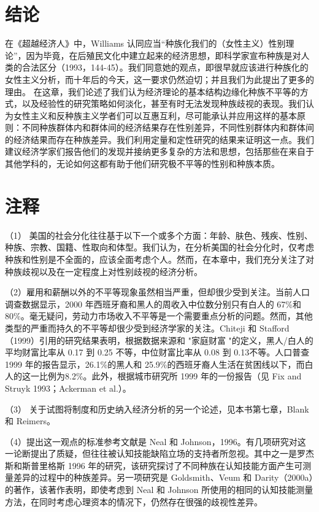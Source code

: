 \documentclass[UTF8]{ctexart}
\begin{document}
\section{结论}在《超越经济人》中，Williams 认同应当“种族化我们的（女性主义）性别理论”，因为毕竟，在后殖民文化中建立起来的经济思想，即科学家宣布种族是对人类的合法区分（1993，144-45）。我们同意她的观点，即很早就应该进行种族化的女性主义分析，而十年后的今天，这一要求仍然迫切；并且我们为此提出了更多的理由。
在这章，我们论述了我们认为经济理论的基本结构边缘化种族不平等的方式，以及经验性的研究策略如何淡化，甚至有时无法发现种族歧视的表现。我们认为女性主义和反种族主义学者们可以互惠互利，尽可能承认并应用这样的基本原则：不同种族群体内和群体间的经济结果存在性别差异，不同性别群体内和群体间的经济结果而存在种族差异。我们利用定量和定性研究的结果来证明这一点。我们建议经济学家们报告他们的发现并接纳更多复杂的方法和思想，包括那些在来自于其他学科的，无论如何这都有助于他们研究极不平等的性别和种族本质。

\section{注释}
（1）  美国的社会分化往往基于以下一个或多个方面：年龄、肤色、残疾、性别、种族、宗教、国籍、性取向和体型。我们认为，在分析美国的社会分化时，仅考虑种族和性别是不全面的，应该全面考虑个人。然而，在本章中，我们充分关注了对种族歧视以及在一定程度上对性别歧视的经济分析。


（2）雇用和薪酬以外的不平等现象虽然相当严重，但却很少受到关注。当前人口调查数据显示，2000 年西班牙裔和黑人的周收入中位数分别只有白人的 67\%和 80\%。毫无疑问，劳动力市场收入不平等是一个需要重点分析的问题。然而，其他类型的严重而持久的不平等却很少受到经济学家的关注。Chiteji 和 Stafford（1999）引用的研究结果表明，根据数据来源和 "家庭财富 "的定义，黑人/白人的平均财富比率从 0.17 到 0.25 不等，中位财富比率从 0.08 到 0.13不等。人口普查 1999 年的报告显示，26.1\%的黑人和 25.9\%的西班牙裔人生活在贫困线以下，而白人的这一比例为8.2\%。此外，根据城市研究所 1999 年的一份报告（见 Fix and Struyk 1993；Ackerman et al.）。


（3）  关于试图将制度和历史纳入经济分析的另一个论述，见本书第七章，Blank 和 Reimers。


（4）提出这一观点的标准参考文献是 Neal 和 Johnson，1996。有几项研究对这一论断提出了质疑，但往往被认知技能缺陷立场的支持者所忽视。其中之一是罗杰斯和斯普里格斯 1996 年的研究，该研究探讨了不同种族在认知技能方面产生可测量差异的过程中的种族差异。另一项研究是 Goldsmith、Veum 和 Darity（2000a）的著作，该著作表明，即使考虑到 Neal 和 Johnson 所使用的相同的认知技能测量方法，在同时考虑心理资本的情况下，仍然存在很强的歧视性差异。
\end{document}
